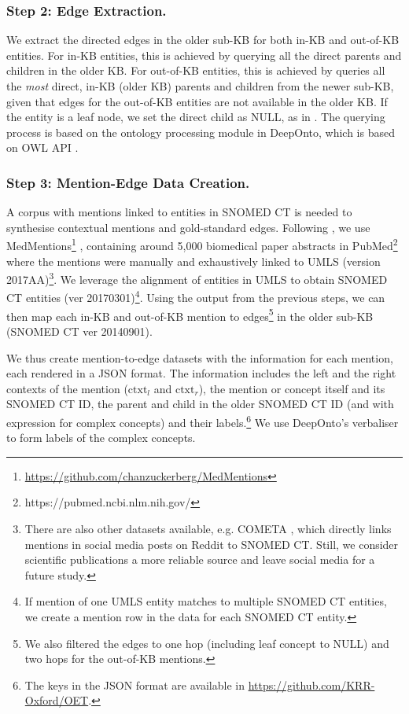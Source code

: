 \documentclass[sigconf]{acmart}
\begin{document}
\subsubsection*{Step 2: Edge Extraction.}
We extract the directed edges in the older sub-KB for both in-KB and out-of-KB entities. For in-KB entities, this is achieved by querying all the direct parents and children in the older KB. For out-of-KB entities, this is achieved by queries all the \textit{most} direct, in-KB (older KB) parents and children from the newer sub-KB, given that edges for the out-of-KB entities are not available in the older KB. If the entity is a leaf node, we set the direct child as NULL, as in \citet{zhang2021TMN}. The querying process is based on the ontology processing module in DeepOnto, which is based on OWL API \cite{horridge2011owl}.

\subsubsection*{Step 3: Mention-Edge Data Creation.}
A corpus with mentions linked to entities in SNOMED CT is needed to synthesise contextual mentions and gold-standard edges. Following \citet{dong2023NIL}, we use MedMentions\footnote{\url{https://github.com/chanzuckerberg/MedMentions}} \cite{Mohan2019medmentions}, containing around 5,000 biomedical paper abstracts in PubMed\footnote{https://pubmed.ncbi.nlm.nih.gov/} where the mentions were manually and exhaustively linked to UMLS \cite{Bodenreider2004umls} (version 2017AA)\footnote{There are also other datasets available, e.g. COMETA \cite{basaldella2020cometa}, which directly links mentions in social media posts on Reddit to SNOMED CT. Still, we consider scientific publications a more reliable source and leave social media for a future study.}. We leverage the alignment of entities in UMLS to obtain  SNOMED CT entities (ver 20170301)\footnote{If mention of one UMLS entity matches to multiple SNOMED CT entities, we create a mention row in the data for each SNOMED CT entity.}. Using the output from the previous steps, we can then map each in-KB and out-of-KB mention to edges\footnote{We also filtered the edges to one hop (including leaf concept to NULL) and two hops for the out-of-KB mentions.} in the older sub-KB (SNOMED CT ver 20140901).

We thus create mention-to-edge datasets with the information for each mention, each rendered in a JSON format. The information includes the left and the right contexts of the mention ($\text{ctxt}_l$ and $\text{ctxt}_r$), the mention or concept itself and its SNOMED CT ID, the parent and child in the older SNOMED CT ID (and with expression for complex concepts) and their labels.\footnote{The keys in the JSON format are available in \url{https://github.com/KRR-Oxford/OET}.} We use DeepOnto's verbaliser \cite{yuan2023ontolama} to form labels of the complex concepts.
\end{document}
